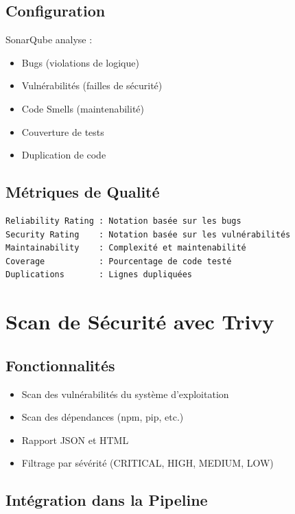 \documentclass[12pt,a4paper]{report}
\begin{document}
\subsection{Configuration}

SonarQube analyse :
\begin{itemize}
    \item Bugs (violations de logique)
    \item Vulnérabilités (failles de sécurité)
    \item Code Smells (maintenabilité)
    \item Couverture de tests
    \item Duplication de code
\end{itemize}

\subsection{Métriques de Qualité}

\begin{verbatim}
Reliability Rating : Notation basée sur les bugs
Security Rating    : Notation basée sur les vulnérabilités  
Maintainability    : Complexité et maintenabilité
Coverage           : Pourcentage de code testé
Duplications       : Lignes dupliquées
\end{verbatim}

\section{Scan de Sécurité avec Trivy}

\subsection{Fonctionnalités}

\begin{itemize}
    \item Scan des vulnérabilités du système d'exploitation
    \item Scan des dépendances (npm, pip, etc.)
    \item Rapport JSON et HTML
    \item Filtrage par sévérité (CRITICAL, HIGH, MEDIUM, LOW)
\end{itemize}

\subsection{Intégration dans la Pipeline}
\end{document}
